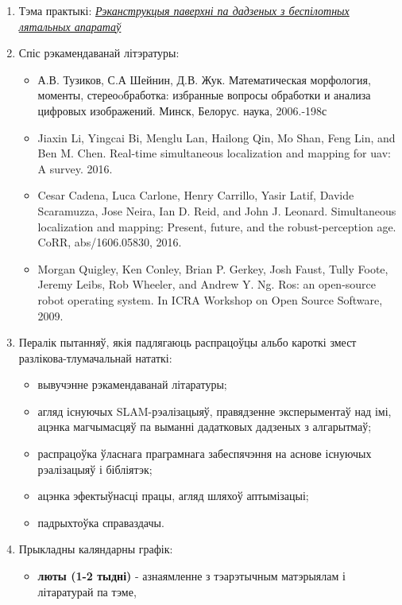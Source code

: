 \documentclass[12pt,a4paper]{extarticle}
\begin{document}
	\begin{enumerate}
		\item Тэма практыкі: \underline{\textit{Рэканструкцыя паверхні па дадзеных з беспілотных}} \\
		\underline{\textit{лятальных апаратаў}}
		\item Спіс рэкамендаванай літэратуры:
			\begin{itemize}
				\item А.В. Тузиков, С.А Шейнин, Д.В. Жук. Математическая морфология, моменты,
				стереоoбработка: избранные вопросы обработки и анализа цифровых изображений. Минск, Белорус. наука, 2006.-198с
				\item Jiaxin Li, Yingcai Bi, Menglu Lan, Hailong Qin, Mo Shan, Feng Lin, and Ben M. Chen.
				Real-time simultaneous localization and mapping for uav: A survey. 2016.
				\item Cesar Cadena, Luca Carlone, Henry Carrillo, Yasir Latif, Davide Scaramuzza,
				Jose Neira, Ian D. Reid, and John J. Leonard. Simultaneous localization and mapping:
				Present, future, and the robust-perception age. CoRR, abs/1606.05830, 2016.
				\item Morgan Quigley, Ken Conley, Brian P. Gerkey, Josh Faust, Tully Foote, Jeremy Leibs,
				Rob Wheeler, and Andrew Y. Ng. Ros: an open-source robot operating system.
				In ICRA Workshop on Open Source Software, 2009.
			\end{itemize}
		\item Пералік пытанняў, якія падлягаюць распрацоўцы альбо кароткі змест разлікова-тлумачальнай нататкі:
			\begin{itemize}
				\item вывучэнне рэкамендаванай літаратуры;
				\item агляд існуючых SLAM-рэалізацыяў, правядзенне эксперыментаў над імі, ацэнка магчымасцяў
				па выманні дадатковых дадзеных з алгарытмаў;
				\item распрацоўка ўласнага праграмнага забеспячэння на аснове існуючых рэалізацыяў
				і бібліятэк;
				\item ацэнка эфектыўнасці працы, агляд шляхоў аптымізацыі;
				\item падрыхтоўка справаздачы.
			\end{itemize}
		\newpage
		\item Прыкладны каляндарны графік:
			\begin{itemize}
				\item \textbf{люты (1-2 тыдні)} - азнаямленне з тэарэтычным матэрыялам і літаратурай па тэме,

\end{itemize}
\end{enumerate}
\end{document}

